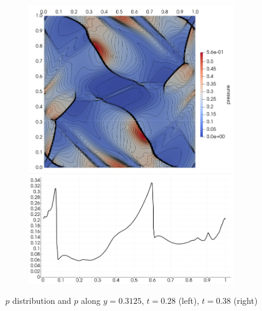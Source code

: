 \begin{figure}[H]
\begin{subfigure}[b]{0.425\textwidth}\includegraphics[width=\textwidth]{img/ot/my4.jpg}\end{subfigure}
\caption{$p$ distribution and $p$ along $y = 0.3125$, $t = 0.28$ (left), $t = 0.38$ (right)}
\label{figure:myOt2}
\end{figure}
\vspace{-8mm}
